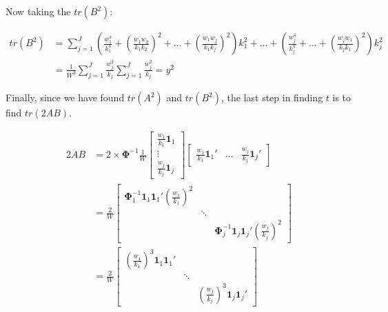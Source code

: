 Now taking the $tr(B^2)$:

\begin{equation}
    \begin{split}
        tr(B^2) & =  \sum_{j=1}^J\left(\frac{w_1^4}{k_1^4} + \left( \frac{w_1w_2}{k_1k_2} \right)^2 + \dots + \left( \frac{w_1w_j}{k_1k_j} \right)^2  \right) k_1^2 +  \dots +  \left(\frac{w_j^4}{k_j^4} +  \dots + \left( \frac{w_jw_1}{k_jk_1} \right)^2  \right) k_j^2 \\
         & = \frac{1}{W^2 }  \sum_{j=1}^J \frac{w_j^2}{k_j}  \sum_{j=1}^J \frac{w_j^2}{k_j} = y^2
    \end{split}
    \nonumber
\end{equation}

Finally, since we have found $tr(A^2)$ and $tr(B^2)$, the last step in finding $t$ is to find $tr(2AB)$. 

\begin{equation}
    \begin{split}
        2AB  & = 2 \times \mathbf{\Phi}^{-1} \frac{1}{W}\begin{bmatrix}
            \frac{w_1}{k_1}\mathbf{1}_1 \\
            \vdots \\
            \frac{w_j}{k_j}\mathbf{1}_j
        \end{bmatrix} \begin{bmatrix}
            \frac{w_1}{k_1}\mathbf{1}_1' & \dots & \frac{w_j}{k_j}\mathbf{1}_j'  
        \end{bmatrix} \\
        & = \frac{2}{W} \begin{bmatrix}
            \mathbf{\Phi}_1^{-1} \mathbf{1}_1\mathbf{1}_1'\left(\frac{w_1}{k_1}\right)^2 & & \\
            & \ddots & \\
            & & \mathbf{\Phi}_j^{-1} \mathbf{1}_j\mathbf{1}_j'\left(\frac{w_j}{k_j}\right)^2
        \end{bmatrix} \\
        & = \frac{2}{W} \begin{bmatrix}
            \left(\frac{w_1}{k_1}\right)^3\mathbf{1}_1\mathbf{1}_1' & & \\
            & \ddots & \\
            & & \left(\frac{w_j}{k_j}\right)^3\mathbf{1}_j\mathbf{1}_j'
        \end{bmatrix}
    \end{split}
    \nonumber
\end{equation}


